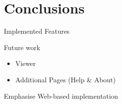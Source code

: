 \chapter{Conclusions} \label{chap:conclusions}

  \begin{notes}
    \item Implemented Features
    \item Future work
    \begin{itemize}
      \item Viewer
      \item Additional Pages (Help \& About)
    \end{itemize}
    \item Emphasise Web-based implementation
  \end{notes}
